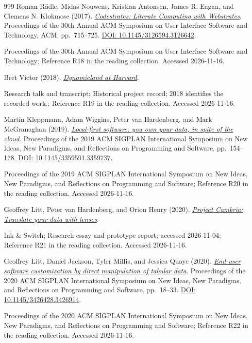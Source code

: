 \documentclass[11pt,letterpaper]{article}
\begin{document}
\begin{thebibliography}{999}
Roman Rädle, Midas Nouwens, Kristian Antonsen, James R. Eagan, and Clemens N. Klokmose (2017).
\href{https://doi.org/10.1145/3126594.3126642}{\emph{Codestrates: Literate Computing with Webstrates}}.
Proceedings of the 30th Annual ACM Symposium on User Interface Software and Technology, ACM, pp.~715--725.
\href{https://doi.org/10.1145/3126594.3126642}{DOI: 10.1145/3126594.3126642}.
\par {\small Proceedings of the 30th Annual ACM Symposium on User Interface Software and Technology; Reference R18 in the reading collection.}
{\small Accessed 2026-11-16.}

Bret Victor (2018).
\href{https://dynamicland.org/2018/Dynamicland/}{\emph{Dynamicland at Harvard}}.
\par {\small Research talk and transcript; Historical project record; 2018 identifies the recorded work.; Reference R19 in the reading collection.}
{\small Accessed 2026-11-16.}

Martin Kleppmann, Adam Wiggins, Peter van Hardenberg, and Mark McGranaghan (2019).
\href{https://doi.org/10.1145/3359591.3359737}{\emph{Local-first software: you own your data, in spite of the cloud}}.
Proceedings of the 2019 ACM SIGPLAN International Symposium on New Ideas, New Paradigms, and Reflections on Programming and Software, pp.~154--178.
\href{https://doi.org/10.1145/3359591.3359737}{DOI: 10.1145/3359591.3359737}.
\par {\small Proceedings of the 2019 ACM SIGPLAN International Symposium on New Ideas, New Paradigms, and Reflections on Programming and Software; Reference R20 in the reading collection.}
{\small Accessed 2026-11-16.}

Geoffrey Litt, Peter van Hardenberg, and Orion Henry (2020).
\href{https://www.inkandswitch.com/cambria/}{\emph{Project Cambria: Translate your data with lenses}}.
\par {\small Ink \& Switch; Research essay and prototype report; accessed 2026-11-04; Reference R21 in the reading collection.}
{\small Accessed 2026-11-16.}

Geoffrey Litt, Daniel Jackson, Tyler Millis, and Jessica Quaye (2020).
\href{https://doi.org/10.1145/3426428.3426914}{\emph{End-user software customization by direct manipulation of tabular data}}.
Proceedings of the 2020 ACM SIGPLAN International Symposium on New Ideas, New Paradigms, and Reflections on Programming and Software, pp.~18--33.
\href{https://doi.org/10.1145/3426428.3426914}{DOI: 10.1145/3426428.3426914}.
\par {\small Proceedings of the 2020 ACM SIGPLAN International Symposium on New Ideas, New Paradigms, and Reflections on Programming and Software; Reference R22 in the reading collection.}
{\small Accessed 2026-11-16.}


\end{thebibliography}
\end{document}
